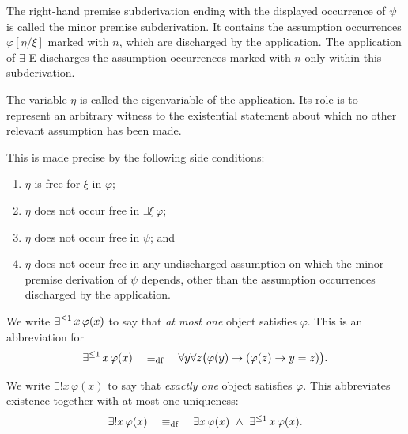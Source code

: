 The right-hand premise subderivation ending with the displayed occurrence of $\psi$ is called the minor premise subderivation. It contains the assumption occurrences $\varphi[\eta/\xi]$ marked with $n$, which are discharged by the application. The application of \(\exists\)-E discharges the assumption occurrences marked with \(n\) only within this subderivation.

The variable \(\eta\) is called the eigenvariable of the application. Its role is to represent an arbitrary witness to the existential statement about which no other relevant assumption has been made.

This is made precise by the following side conditions:

\begin{enumerate}
    \item \(\eta\) is free for \(\xi\) in \(\varphi\);

    \item \(\eta\) does not occur free in \(\exists\xi\,\varphi\);

    \item \(\eta\) does not occur free in \(\psi\); and

    \item \(\eta\) does not occur free in any undischarged assumption on which the minor premise derivation of \(\psi\) depends, other than the assumption occurrences discharged by the application.
\end{enumerate}

\vspace{0.35cm}







\begin{definition}[Uniqueness]
\label{def:uniqueness}
We write $\mathop{\exists^{\leq 1}} x\,\varphi(x)$ to say that \emph{at most one}
object satisfies $\varphi$. This is an abbreviation for
\[
\mathop{\exists^{\leq 1}} x\,\varphi(x)
\quad\mathrel{\equiv_{\mathrm{df}}}\quad
\forall y\forall z\bigl(
\varphi(y)\to(\varphi(z)\to y=z)
\bigr).
\]
\end{definition}

\begin{definition}\label{def:unique-existence}
We write $\exists!x\,\varphi(x)$ to say that \emph{exactly one}
object satisfies $\varphi$. This abbreviates existence together
with at-most-one uniqueness:
\[
\exists!x\,\varphi(x)
\quad\mathrel{\equiv_{\mathrm{df}}}\quad
\exists x\,\varphi(x) \ \land \ \mathop{\exists^{\leq 1}} x\,\varphi(x).
\]
\end{definition}

